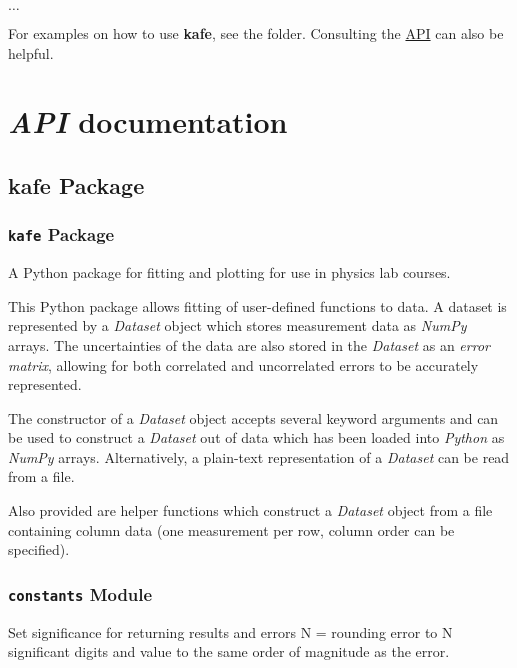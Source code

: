 \documentclass[a4paper,10pt,english]{sphinxmanual}
\begin{document}
$\ldots$

For examples on how to use \textbf{kafe}, see the  folder. Consulting
the {\hyperref[index:api]{API}} can also be helpful.


\chapter{\emph{API} documentation}
\label{index:api-documentation}

\section{kafe Package}
\label{index:api}\label{index:kafe-package}

\subsection{\texttt{kafe} Package}
\label{index:id1}\label{index:module-kafe.__init__}
A Python package for fitting and plotting for use in physics lab courses.

This Python package allows fitting of user-defined functions to data. A dataset is
represented by a \emph{Dataset} object which stores measurement data as \emph{NumPy} arrays.
The uncertainties of the data are also stored in the \emph{Dataset} as an \emph{error matrix},
allowing for both correlated and uncorrelated errors to be accurately represented.

The constructor of a \emph{Dataset} object accepts several keyword arguments and can be used
to construct a \emph{Dataset} out of data which has been loaded into \emph{Python} as \emph{NumPy} arrays.
Alternatively, a plain-text representation of a \emph{Dataset} can be read from a file.

Also provided are helper functions which construct a \emph{Dataset} object from a
file containing column data (one measurement per row, column order can be specified).


\subsection{\texttt{constants} Module}
\label{index:constants-module}\label{index:module-kafe.constants}\label{index:module-constants}

\begin{fulllineitems}
\label{index:kafe.constants.F_SIGNIFICANCE}
Set significance for returning results and errors
N = rounding error to N significant digits and value
to the same order of magnitude as the error.

\end{fulllineitems}
\end{document}
